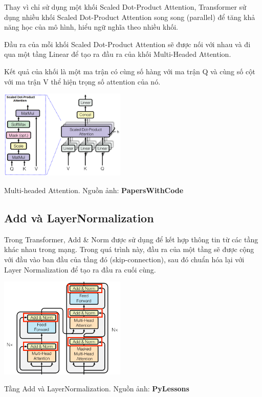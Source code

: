 \documentclass[a4paper, 10pt]{article}
\begin{document}
Thay vì chỉ sử dụng một khối Scaled Dot-Product Attention, Transformer sử dụng 
nhiều khối Scaled Dot-Product Attention song song (parallel) để tăng khả năng học của mô hình, hiểu ngữ nghĩa theo nhiều khối.

Đầu ra của mỗi khối Scaled Dot-Product Attention sẽ được nối với nhau và đi qua một tầng Linear để tạo ra đầu ra của khối Multi-Headed Attention.

Kết quả của khối là một ma trận có cùng số hàng với ma trận Q và cùng số cột với ma trận V thể hiện trọng số attention của nó.

\begin{minipage}{\linewidth}
    \captionsetup{type=figure}
    \centering
    \includegraphics[width=6cm]{./MultiHead.png}
    \caption{Multi-headed Attention. Nguồn ảnh: \textbf{PapersWithCode}}
\end{minipage}

\subsection{Add và LayerNormalization}
Trong Transformer, Add \& Norm được sử dụng để kết hợp thông tin 
từ các tầng khác nhau trong mạng. Trong quá trình này, đầu ra của một tầng sẽ được 
cộng với đầu vào ban đầu của tầng đó (skip-connection), sau đó chuẩn hóa lại với Layer 
Normalization để tạo ra đầu ra cuối cùng. 

\begin{minipage}{\linewidth}
    \captionsetup{type=figure}
    \centering
    \includegraphics[width=6cm]{./Add+Norm.png}
    \caption{Tầng Add và LayerNormalization. Nguồn ảnh: \textbf{PyLessons}}
\end{minipage}
\end{document}
